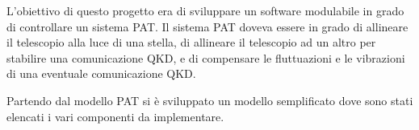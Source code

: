 L'obiettivo di questo progetto era di sviluppare un software modulabile in grado di controllare un sistema PAT. Il sistema PAT doveva essere in grado di allineare il telescopio alla luce di una stella, di allineare il telescopio ad un altro per stabilire una comunicazione QKD, e di compensare le fluttuazioni e le vibrazioni di una eventuale comunicazione QKD.

Partendo dal modello PAT  si è sviluppato un modello semplificato  dove sono stati elencati i vari componenti da implementare.




